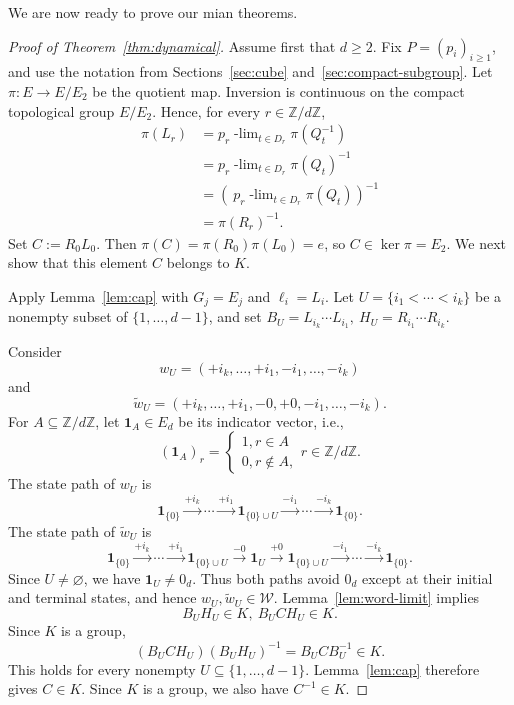 \documentclass[11pt]{amsart}
\theoremstyle{definition}
\theoremstyle{remark}
\newcommand{\Z}{\mathbb Z}
\newcommand{\cW}{\mathcal W}
\newcommand{\ulim}[2]{#1\!\operatorname{-lim}_{#2}}
\begin{document}
We are now ready to prove our mian theorems.

\begin{proof}[Proof of Theorem~\ref{thm:dynamical}]
Assume first that $d\geq2$.  Fix $P=(p_i)_{i\geq1}$, and use the
notation from Sections~\ref{sec:cube} and~\ref{sec:compact-subgroup}.
Let $\pi:E\longrightarrow E/E_2$ be the quotient map.  Inversion is continuous
on the compact topological
group $E/E_2$.  Hence, for every $r\in\Z/d\Z$,
\[
\begin{aligned}
 \pi(L_r)
 &=\ulim{  p_r}{t\in D_r}\pi(Q_t^{-1})\\
 &=\ulim{ p_r}{t\in D_r}\pi(Q_t)^{-1}\\
 &=\left(\ulim{\ p_r}{t\in D_r}\pi(Q_t)\right)^{-1}\\
 &=\pi(R_r)^{-1}.
\end{aligned}
\]
Set $C:=R_0L_0$.
Then $\pi(C)=\pi(R_0)\pi(L_0)=e$,
so $C\in\ker\pi=E_2$. We next show that this element $C$ belongs to $K$.
 

Apply Lemma~\ref{lem:cap} with $G_j=E_j$ and $\ell_i=L_i$.  Let
$U=\{i_1<\cdots<i_k\}$ be a nonempty subset of $\{1,\ldots,d-1\}$, and set $B_U=L_{i_k}\cdots L_{i_1},\ H_U=R_{i_1}\cdots R_{i_k}$.
 
 
Consider
\[
 w_U=(+i_k,\ldots,+i_1,-i_1,\ldots,-i_k)
\]
and
\[
 \widetilde w_U=(+i_k,\ldots,+i_1,-0,+0,-i_1,\ldots,-i_k).
\]
For $A\subseteq\Z/d\Z$, let $\mathbf1_A\in E_d$ be its indicator vector, i.e., 
\[
 (\mathbf1_A)_r= \begin{cases}
                  1, r\in A\\
                  0, r\notin A, 
                  \end{cases}   r\in \Z/d\Z.
\]
The state path of $w_U$ is
\[
 \mathbf1_{\{0\}}
 \xrightarrow{+i_k}\cdots\xrightarrow{+i_1}
 \mathbf1_{\{0\}\cup U}
 \xrightarrow{-i_1}\cdots\xrightarrow{-i_k}
 \mathbf1_{\{0\}}.
\]
The state path of $\widetilde w_U$ is
\[
 \mathbf1_{\{0\}}
 \xrightarrow{+i_k}\cdots\xrightarrow{+i_1}
 \mathbf1_{\{0\}\cup U} \xrightarrow{-0}
 \mathbf1_U\xrightarrow{+0}
 \mathbf1_{\{0\}\cup U} 
 \xrightarrow{-i_1}\cdots\xrightarrow{-i_k}
 \mathbf1_{\{0\}}.
\]
Since $U\neq\varnothing$, we have $\mathbf1_U\neq0_d$.  Thus both
paths avoid $0_d$ except at their initial and terminal states, and hence $w_U,\widetilde w_U\in\cW$.
Lemma~\ref{lem:word-limit} implies  
\[
 B_UH_U\in K, \ B_UCH_U\in K.
\]
Since $K$ is a group,
\[
 (B_UCH_U)(B_UH_U)^{-1}=B_UCB_U^{-1}\in K.
\]
This holds for every nonempty $U\subseteq\{1,\ldots,d-1\}$.  
Lemma~\ref{lem:cap} therefore gives $C\in K$.  Since $K$ is a group, we also have $C^{-1}\in K$.
 


\end{proof}
\end{document}
